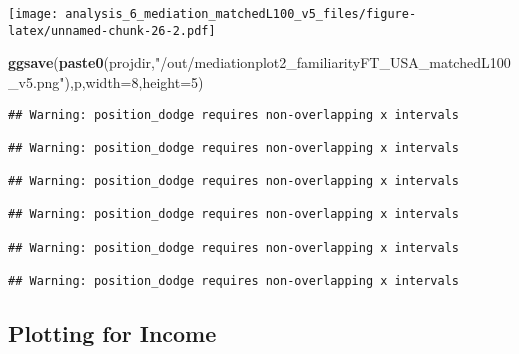 \documentclass[
]{article}
\newenvironment{Shaded}{\begin{snugshade}}{\end{snugshade}}
\newcommand{\DataTypeTok}[1]{\textcolor[rgb]{0.13,0.29,0.53}{#1}}
\newcommand{\DecValTok}[1]{\textcolor[rgb]{0.00,0.00,0.81}{#1}}
\newcommand{\KeywordTok}[1]{\textcolor[rgb]{0.13,0.29,0.53}{\textbf{#1}}}
\newcommand{\NormalTok}[1]{#1}
\newcommand{\StringTok}[1]{\textcolor[rgb]{0.31,0.60,0.02}{#1}}
\begin{document}
\texttt{[image: analysis\_6\_mediation\_matchedL100\_v5\_files/figure-latex/unnamed-chunk-26-2.pdf]}

\begin{Shaded}
\begin{Highlighting}[]
\KeywordTok{ggsave}\NormalTok{(}\KeywordTok{paste0}\NormalTok{(projdir,}\StringTok{"/out/mediationplot2_familiarityFT_USA_matchedL100_v5.png"}\NormalTok{),p,}\DataTypeTok{width=}\DecValTok{8}\NormalTok{,}\DataTypeTok{height=}\DecValTok{5}\NormalTok{)}
\end{Highlighting}
\end{Shaded}

\begin{verbatim}
## Warning: position_dodge requires non-overlapping x intervals

## Warning: position_dodge requires non-overlapping x intervals

## Warning: position_dodge requires non-overlapping x intervals

## Warning: position_dodge requires non-overlapping x intervals

## Warning: position_dodge requires non-overlapping x intervals

## Warning: position_dodge requires non-overlapping x intervals
\end{verbatim}

\hypertarget{plotting-for-income}{%
\subsection{Plotting for Income}\label{plotting-for-income}}
\end{document}
